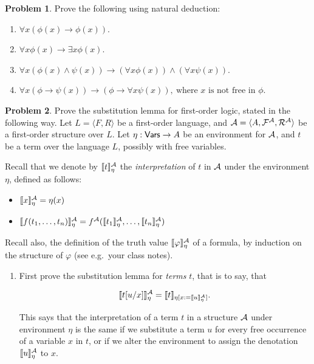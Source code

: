 \documentclass[a4paper]{article}
\theoremstyle{definition}
\newtheorem{prob}{Problem}
\newcommand{\imp}{\rightarrow}
\newcommand{\ang}[1]{\langle {#1} \rangle}   %
\newcommand{\mea}{\llbracket}
\newcommand{\ning}{\rrbracket}
\newcommand{\me}[1]{\mea{#1}\ning}
\begin{document}
\begin{prob}
Prove the following using natural deduction:
\begin{enumerate}
\item $\forall x(\phi(x) \rightarrow \phi(x))$.
\item $\forall x\phi(x) \rightarrow \exists x\phi(x)$.
\item $\forall x(\phi(x) \wedge \psi(x)) \rightarrow 
       (\forall x\phi(x)) \wedge (\forall x \psi(x))$.
\item $\forall x(\phi \rightarrow \psi(x)) \rightarrow 
       (\phi \rightarrow \forall x \psi(x)),~
       \text{where $x$ is not free in $\phi$}$.
\end{enumerate}
\end{prob}

\begin{prob}
Prove the substitution lemma for first-order logic, stated in the
following way. Let $L = \ang{F, R}$ be a first-order language, and 
${\cal A}=\ang{A, {\cal F}^{\cal A}, {\cal R}^{\cal A}}$ be a
first-order structure over $L$.
Let $\eta:{\sf Vars}\imp A$ be an environment for ${\cal A}$,
and $t$ be a term over the language $L$, possibly with
free variables.

\newcommand{\semeta}[1]{\me{#1}_{\eta}^{\cal A}}

Recall that we denote by $\semeta{t}$ the \emph{interpretation} of
$t$ in ${\cal A}$ under the environment $\eta$, defined as follows:

\begin{itemize}
\item $\semeta{x} = \eta(x)$
\item $\semeta{f(t_1,\ldots,t_n)} = 
      f^{\cal A}(\semeta{t_1},\ldots,\semeta{t_n})$
\end{itemize}

\noindent
Recall also, the definition of the truth value 
$\semeta{\varphi}$ of a formula, by induction on the structure of
$\varphi$ (see e.g.~your class notes).

\begin{enumerate}

\item First prove the substitution lemma for {\em terms} $t$, that
      is to say, that 

      \[ \semeta{t[u/x]} = \me{t}_{\eta[x:=\semeta{u}]}. \] 

      This says that the interpretation of a term $t$ in a structure
      ${\cal A}$ under environment $\eta$ is the same if we substitute
      a term $u$ for every free occurrence of a variable $x$ in $t$,
      or if we alter the environment to assign the denotation
      $\semeta{u}$ to $x$.


\end{enumerate}
\end{prob}
\end{document}
